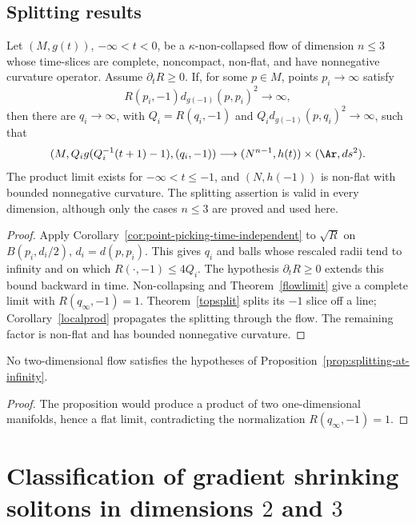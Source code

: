 \subsection{Splitting results}

\begin{proposition}\label{prop:splitting-at-infinity}
\label{prodatinf}
Let $(M,g(t))$, $-\infty<t<0$, be a $\kappa$-non-collapsed flow of
dimension $n\leq3$ whose time-slices are complete, noncompact,
non-flat, and have nonnegative curvature operator. Assume
$\partial_tR\geq0$. If, for some $p\in M$, points $p_i\to\infty$
satisfy
\[
 R(p_i,-1)d_{g(-1)}(p,p_i)^2\longrightarrow\infty,
\]
then there are $q_i\to\infty$, with $Q_i=R(q_i,-1)$ and
$Q_id_{g(-1)}(p,q_i)^2\to\infty$, such that
\[
 (M,Q_ig(Q_i^{-1}(t+1)-1),(q_i,-1))
 \longrightarrow (N^{n-1},h(t))\times(\Ar,ds^2).
\]
The product limit exists for $-\infty<t\leq-1$, and
$(N,h(-1))$ is non-flat with bounded nonnegative curvature.
The splitting assertion is valid in every dimension, although only
the cases $n\leq3$ are proved and used here.
\end{proposition}
\begin{proof}
\sketch
{}
Apply Corollary~\ref{cor:point-picking-time-independent} to
$\sqrt R$ on $B(p_i,d_i/2)$, $d_i=d(p,p_i)$. This gives $q_i$ and
balls whose rescaled radii tend to infinity and on which
$R(\cdot,-1)\leq4Q_i$. The hypothesis $\partial_tR\geq0$ extends
this bound backward in time. Non-collapsing and
Theorem~\ref{flowlimit} give a complete limit with
$R(q_\infty,-1)=1$. Theorem~\ref{topsplit} splits its $-1$ slice
off a line; Corollary~\ref{localprod} propagates the splitting
through the flow. The remaining factor is non-flat and has bounded
nonnegative curvature.
\end{proof}

\begin{corollary}\label{cor:no-two-dimensional-splitting-example}
\label{compact2D}
No two-dimensional flow satisfies the hypotheses of
Proposition~\ref{prop:splitting-at-infinity}.
\end{corollary}
\begin{proof}
\sketch The proposition would produce a product of two
one-dimensional manifolds, hence a flat limit, contradicting the
normalization $R(q_\infty,-1)=1$.
\end{proof}

\section{Classification of gradient shrinking solitons in dimensions $2$ and $3$}

